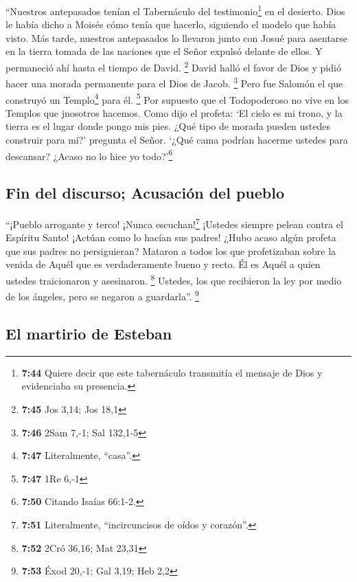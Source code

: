 ``Nuestros antepasados tenían el Tabernáculo del
testimonio\footnote{\textbf{7:44} Quiere decir que este tabernáculo
  transmitía el mensaje de Dios y evidenciaba su presencia.} en el
desierto. Dios le había dicho a Moisés cómo tenía que hacerlo, siguiendo
el modelo que había visto.  Más tarde, nuestros
antepasados lo llevaron junto con Josué para asentarse en la tierra
tomada de las naciones que el Señor expulsó delante de ellos. Y
permaneció ahí hasta el tiempo de David. \footnote{\textbf{7:45} Jos
  3,14; Jos 18,1}  David halló el favor de Dios y pidió
hacer una morada permanente para el Dios de Jacob. \footnote{\textbf{7:46}
  2Sam 7,-1; Sal 132,1-5}  Pero fue Salomón el que
construyó un Templo\footnote{\textbf{7:47} Literalmente, ``casa''.} para
él. \footnote{\textbf{7:47} 1Re 6,-1}  Por supuesto que
el Todopoderoso no vive en los Templos que jnosotros hacemos. Como dijo
el profeta:  `El cielo es mi trono, y la tierra es el
lugar donde pongo mis pies. ¿Qué tipo de morada pueden ustedes construir
para mí?' pregunta el Señor. `¿Qué cama podrían hacerme ustedes para
descansar?  ¿Acaso no lo hice yo todo?'\footnote{\textbf{7:50}
  Citando Isaías 66:1-2.}

\hypertarget{fin-del-discurso-acusaciuxf3n-del-pueblo}{%
\subsection{Fin del discurso; Acusación del
pueblo}\label{fin-del-discurso-acusaciuxf3n-del-pueblo}}

 ``¡Pueblo arrogante y terco! ¡Nunca escuchan!\footnote{\textbf{7:51}
  Literalmente, ``incircuncisos de oídos y corazón''.} ¡Ustedes siempre
pelean contra el Espíritu Santo! ¡Actúan como lo hacían sus padres!
 ¿Hubo acaso algún profeta que sus padres no
persiguieran? Mataron a todos los que profetizaban sobre la venida de
Aquél que es verdaderamente bueno y recto. Él es Aquél a quien ustedes
traicionaron y asesinaron. \footnote{\textbf{7:52} 2Cró 36,16; Mat 23,31}
 Ustedes, los que recibieron la ley por medio de los
ángeles, pero se negaron a guardarla''. \footnote{\textbf{7:53} Éxod
  20,-1; Gal 3,19; Heb 2,2}

\hypertarget{el-martirio-de-esteban}{%
\subsection{El martirio de Esteban}\label{el-martirio-de-esteban}}

